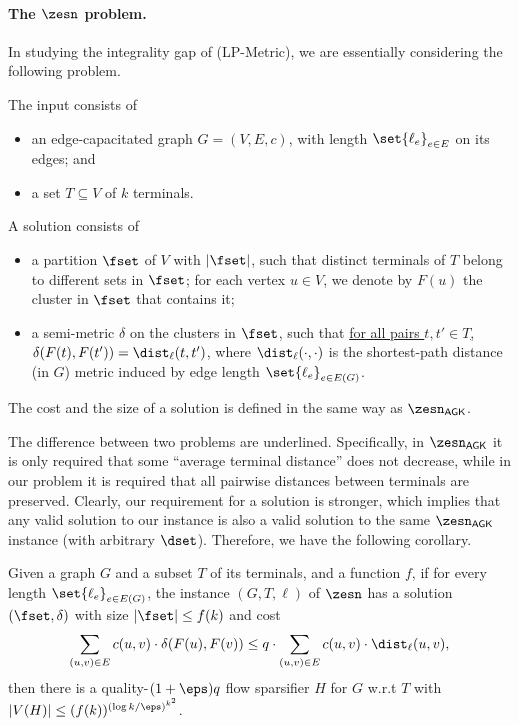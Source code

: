 \paragraph{The $\zesn$ problem.}
In studying the integrality gap of (\textnormal{\textsf{LP-Metric}}), we are essentially considering the following problem.

The input consists of
\begin{itemize}
	\item an edge-capacitated graph $G=(V,E,c)$, with length $\set{\ell_e}_{e\in E}$ on its edges; and
	\item a set $T\subseteq V$ of $k$ terminals.
\end{itemize}
A solution consists of
\begin{itemize}
	\item a partition $\fset$ of $V$ with $|\fset|$, such that distinct terminals of $T$ belong to different sets in $\fset$; for each vertex $u\in V$, we denote by $F(u)$ the cluster in $\fset$ that contains it;
	\item a semi-metric $\delta$ on the clusters in $\fset$, such that \underline{for all pairs $t,t'\in T$, $\delta(F(t),F(t'))= \dist_{\ell}(t,t')$}, where $\dist_{\ell}(\cdot,\cdot)$ is the shortest-path distance (in $G$) metric induced by edge length $\set{\ell_e}_{e\in E(G)}$.
\end{itemize}
The cost and the size of a solution is defined in the same way as $\zesn_{\textsf{AGK}}$.


The difference between two problems are underlined. Specifically, in $\zesn_{\textsf{AGK}}$ it is only required that some ``average terminal distance'' does not decrease, while in our problem it is  required that all pairwise distances between terminals are preserved.
Clearly, our requirement for a solution is stronger, which implies that any valid solution to our instance is also a valid solution to the same $\zesn_{\textsf{AGK}}$ instance (with arbitrary $\dset$). Therefore, we have the following corollary.

\begin{corollary}
Given a graph $G$ and a subset $T$ of its terminals, and a function $f$, if for every length $\set{\ell_e}_{e\in E(G)}$, the instance $(G,T,\ell)$ of $\zesn$ has a solution $(\fset,\delta)$ with size $|\fset|\le f(k)$ and cost 
	\[\sum_{(u,v)\in E}c(u,v)\cdot\delta(F(u),F(v))\le q\cdot \sum_{(u,v)\in E}c(u,v)\cdot\dist_{\ell}(u,v),\] 
	then there is a quality-$(1+\eps) q$ flow sparsifier $H$ for $G$ w.r.t $T$ with $|V(H)|\le (f(k))^{(\log k/\eps)^{k^2}}$.
\end{corollary}

